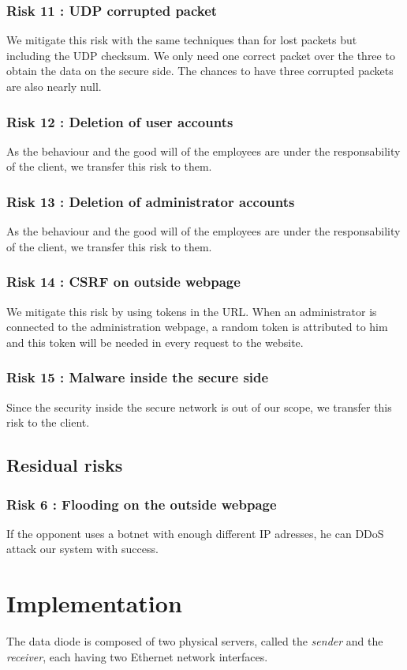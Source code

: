 \documentclass[a4paper,11pt]{article}
\begin{document}
\subsubsection{Risk 11 : UDP corrupted packet}
We mitigate this risk with the same techniques than for lost packets but including the UDP checksum. We only need one correct packet over the three to obtain the data on the secure side. The chances to have three corrupted packets are also nearly null.
\subsubsection{Risk 12 : Deletion of user accounts}
As the behaviour and the good will of the employees are under the responsability of the client, we transfer this risk to them.
\subsubsection{Risk 13 : Deletion of administrator accounts}
As the behaviour and the good will of the employees are under the responsability of the client, we transfer this risk to them.
\subsubsection{Risk 14 : CSRF on outside webpage}
We mitigate this risk by using tokens in the URL. When an administrator is connected to the administration webpage, a random token is attributed to him and this token will be needed in every request to the website.
\subsubsection{Risk 15 : Malware inside the secure side}
Since the security inside the secure network is out of our scope, we transfer this risk to the client.

\subsection{Residual risks}
\subsubsection{Risk 6 : Flooding on the outside webpage}
If the opponent uses a botnet with enough different IP adresses, he can DDoS attack our system with success.

\section{Implementation}
The data diode is composed of two physical servers, called the \textit{sender} and the \textit{receiver}, each having two Ethernet network interfaces.\\
\end{document}
